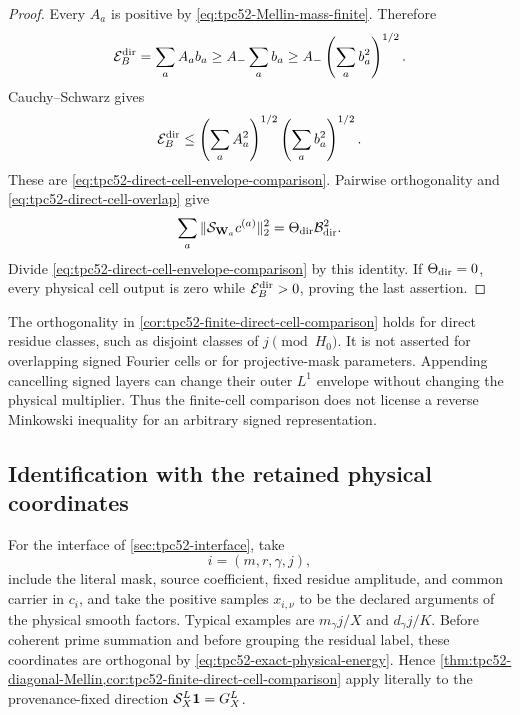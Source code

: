 \begin{proof}
Every \(A_a\) is positive by
\eqref{eq:tpc52-Mellin-mass-finite}.  Therefore
\begin{equation}
 \mathcal E_B^{\rm dir}
 =\sum_aA_ab_a
 \geq A_-\sum_ab_a
 \geq A_-\left(\sum_ab_a^2\right)^{1/2}.
 \label{eq:tpc52-direct-cell-lower-L1}
\end{equation}
Cauchy--Schwarz gives
\begin{equation}
 \mathcal E_B^{\rm dir}
 \leq\left(\sum_aA_a^2\right)^{1/2}
      \left(\sum_ab_a^2\right)^{1/2}.
 \label{eq:tpc52-direct-cell-upper-L1}
\end{equation}
These are \eqref{eq:tpc52-direct-cell-envelope-comparison}.  Pairwise
orthogonality and \eqref{eq:tpc52-direct-cell-overlap} give
\begin{equation}
 \sum_a\|\mathcal S_{\mathbf W_a}c^{(a)}\|_2^2
 =\Theta_{\rm dir}\mathcal B_{\rm dir}^2.
 \label{eq:tpc52-direct-cell-output-energy}
\end{equation}
Divide \eqref{eq:tpc52-direct-cell-envelope-comparison} by this
identity.  If \(\Theta_{\rm dir}=0\), every physical cell output is
zero while \(\mathcal E_B^{\rm dir}>0\), proving the last assertion.
\end{proof}

\begin{remark}
\label{rem:tpc52-direct-cells-essential}
The orthogonality in
\cref{cor:tpc52-finite-direct-cell-comparison} holds for direct residue
classes, such as disjoint classes of \(j\pmod {H_0}\).  It is not
asserted for overlapping signed Fourier cells or for projective-mask
parameters.  Appending cancelling signed layers can change their outer
\(L^1\) envelope without changing the physical multiplier.  Thus the
finite-cell comparison does not license a reverse Minkowski inequality
for an arbitrary signed representation.
\end{remark}

\subsection{Identification with the retained physical coordinates}

For the interface of \cref{sec:tpc52-interface}, take
\begin{equation}
 i=(m,r,\gamma,j),
 \label{eq:tpc52-physical-coordinate-identification}
\end{equation}
include the literal mask, source coefficient, fixed residue amplitude,
and common carrier in \(c_i\), and take the positive samples
\(x_{i,\nu}\) to be the declared arguments of the physical smooth
factors.  Typical examples are \(m_\gamma j/X\) and
\(d_\gamma j/K\).  Before coherent prime summation and before grouping
the residual label, these coordinates are orthogonal by
\eqref{eq:tpc52-exact-physical-energy}.  Hence
\cref{thm:tpc52-diagonal-Mellin,cor:tpc52-finite-direct-cell-comparison}
apply literally to the provenance-fixed direction
\(\mathcal S_X^L\mathbf 1=G_X^L\).

